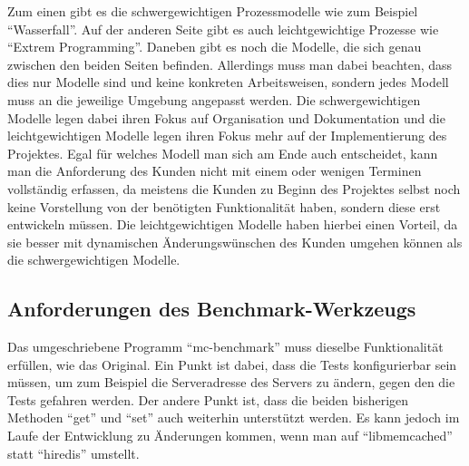 Zum einen gibt es die schwergewichtigen Prozessmodelle wie zum Beispiel
\enquote{Wasserfall}. Auf der anderen Seite gibt es auch leichtgewichtige
Prozesse wie \enquote{Extrem Programming}. Daneben gibt es noch die Modelle,
die sich genau zwischen den beiden Seiten befinden. Allerdings muss man dabei
beachten, dass dies nur Modelle sind und keine konkreten Arbeitsweisen, sondern
jedes Modell muss an die jeweilige Umgebung angepasst werden. Die
schwergewichtigen Modelle legen dabei ihren Fokus auf Organisation und
Dokumentation und die leichtgewichtigen Modelle legen ihren Fokus mehr auf der
Implementierung des Projektes. Egal für welches Modell man sich am Ende auch
entscheidet, kann man die Anforderung des Kunden nicht mit einem oder wenigen
Terminen vollständig erfassen, da meistens die Kunden zu Beginn des Projektes
selbst noch keine Vorstellung von der benötigten Funktionalität haben, sondern
diese erst entwickeln müssen. Die leichtgewichtigen Modelle haben hierbei einen
Vorteil, da sie besser mit dynamischen Änderungswünschen des Kunden umgehen
können als die schwergewichtigen Modelle.

\subsection{Anforderungen des Benchmark-Werkzeugs}
Das umgeschriebene Programm \enquote{mc-benchmark} muss dieselbe Funktionalität
erfüllen, wie das Original. Ein Punkt ist dabei, dass die Tests konfigurierbar
sein müssen, um zum Beispiel die Serveradresse des Servers zu ändern, gegen den
die Tests gefahren werden. Der andere Punkt ist, dass die beiden bisherigen
Methoden \enquote{get} und \enquote{set} auch weiterhin unterstützt werden. Es
kann jedoch im Laufe der Entwicklung zu Änderungen kommen, wenn man auf
\enquote{libmemcached} statt \enquote{hiredis} umstellt.

